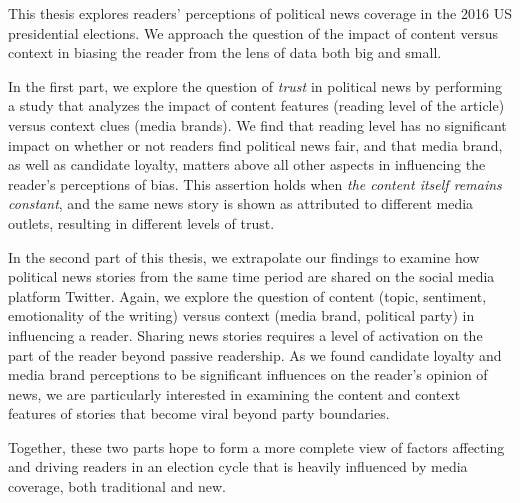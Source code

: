 \def\abstractpage{\cleardoublepage
\begin{center}{\large{\bf \@title} \\
by \\
\@author \\[\baselineskip]}
\par
\def\baselinestretch{1}\@normalsize
Submitted to the \@department, \\
\@school \\
on \@thesisdate, in partial fulfillment of the \\
requirements for the \@degreeword\ of \\
\@degree
\end{center}
\par
\begin{abstract}}

 
This thesis explores readers' perceptions of political news coverage in the 2016 US presidential elections. We approach the question of the impact of content versus context in biasing the reader from the lens of data both big and small.


In the first part, we explore the question of \emph{trust} in political news by performing a study that analyzes the impact of content features (reading level of the article) versus context clues (media brands). We find that reading level has no significant impact on whether or not readers find political news fair, and that media brand, as well as candidate loyalty, matters above all other aspects in influencing the reader's perceptions of bias. This assertion holds when \emph{the content itself remains constant}, and the same news story is shown as attributed to different media outlets, resulting in different levels of trust. 

In the second part of this thesis, we extrapolate our findings to examine how political news stories from the same time period are shared on the social media platform Twitter. Again, we explore the question of content (topic, sentiment, emotionality of the writing) versus context (media brand, political party) in influencing a reader. Sharing news stories requires a level of activation on the part of the reader beyond passive readership. As we found candidate loyalty and media brand perceptions to be significant influences on the reader's opinion of news, we are particularly interested in examining the content and context features of stories that become viral beyond party boundaries.

Together, these two parts hope to form a more complete view of factors affecting and driving readers in an election cycle that is heavily influenced by media coverage, both traditional and new.


\afterpage{\blankpage}

 